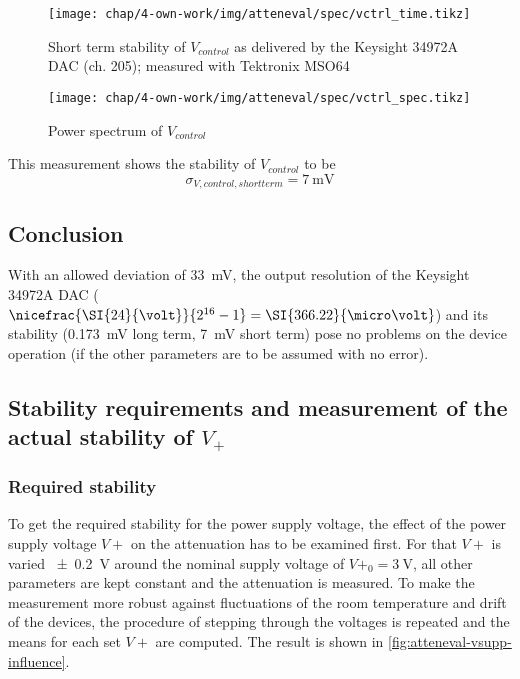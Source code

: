 \begin{figure}[tb]
	\centering
	\texttt{[image: chap/4-own-work/img/atteneval/spec/vctrl\_time.tikz]}
	\caption{Short term stability of $V_{control}$ as delivered by the Keysight 34972A DAC (ch. 205); measured with Tektronix MSO64}
	\label{fig:atteneval-vcontrolstab-shorttermTime}
\end{figure}

\begin{figure}[tb]
	\centering
	\texttt{[image: chap/4-own-work/img/atteneval/spec/vctrl\_spec.tikz]}
	\caption{Power spectrum of $V_{control}$}
	\label{fig:atteneval-vcontrolstab-shorttermSpec}
\end{figure}

This measurement shows the stability of $V_{control}$ to be
\begin{equation}
\sigma_{V,control,shortterm} = \SI{7}{\milli\volt}
\end{equation}

\subsection{Conclusion}
With an allowed deviation of \SI{33}{\mV}, the output resolution of the Keysight 34972A DAC ($\nicefrac{\SI{24}{\volt}}{2^{16}-1}=\SI{366.22}{\micro\volt}$) and its stability (\SI{0.173}{\mV} long term, \SI{7}{\mV} short term) pose no problems on the device operation (if the other parameters are to be assumed with no error).

\FloatBarrier
\subsection{Stability requirements and measurement of the actual stability of $V_{+}$}
\subsubsection{Required stability}
To get the required stability for the power supply voltage, the effect of the power supply voltage $V+$ on the attenuation has to be examined first. For that $V+$ is varied \SI{\pm0.2}{\volt} around the nominal supply voltage of $V+_0=\SI{3}{\volt}$, all other parameters are kept constant and the attenuation is measured. To make the measurement more robust against fluctuations of the room temperature and drift of the devices, the procedure of stepping through the voltages is repeated and the means for each set $V+$ are computed. The result is shown in \autoref{fig:atteneval-vsupp-influence}.

